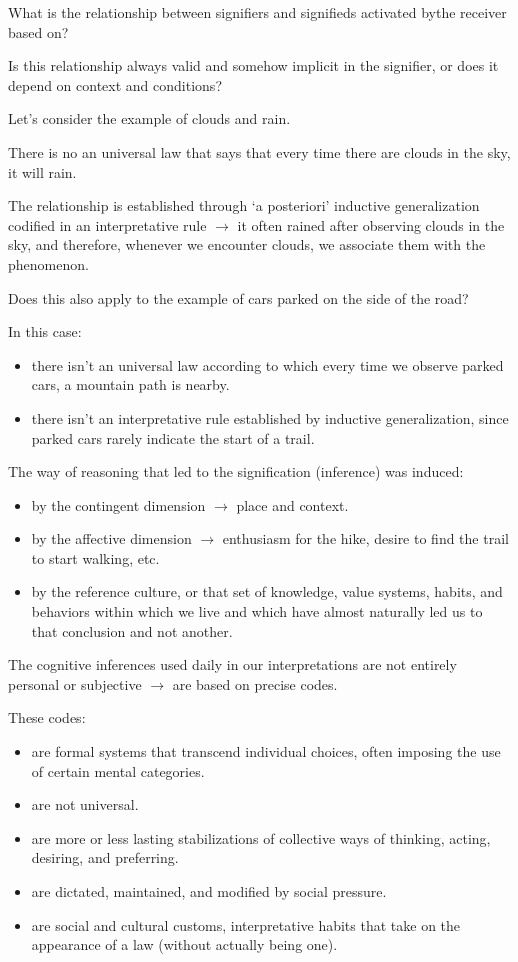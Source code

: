 What is the relationship between signifiers and signifieds activated bythe receiver based  on?

Is this relationship always valid and somehow implicit in the signifier, or does it depend on context and conditions?

Let's consider the example of clouds and rain.

There is no an universal law that says that every time there are clouds in the sky, it will rain.

The relationship is established through `a posteriori' inductive generalization codified in an interpretative rule \(\rightarrow\) it often rained after observing clouds in the sky, and therefore, whenever we encounter clouds, we associate them with the phenomenon.

Does this also apply to the example of cars parked on the side of the road?

In this case:

\begin{itemize}
\tightlist
\item there isn't an universal law according to which every time we observe parked cars, a mountain path is nearby.
\item there isn't an interpretative rule established by inductive generalization, since parked cars rarely indicate the start of a trail.
\end{itemize}

The way of reasoning that led to the signification (inference) was induced:

\begin{itemize}
\tightlist
\item by the contingent dimension \(\rightarrow\) place and context.
\item by the affective dimension \(\rightarrow\) enthusiasm for the hike, desire to find the trail to start walking, etc.
\item by the reference culture, or that set of knowledge, value systems, habits, and behaviors within which we live and which have almost naturally led us to that conclusion and not another.
\end{itemize}

The cognitive inferences used daily in our interpretations are not entirely personal or subjective \(\rightarrow\) are based on precise codes.

These codes:

\begin{itemize}
\tightlist
\item are formal systems that transcend individual choices, often imposing the use of certain mental categories.
\item are not universal.
\item are more or less lasting stabilizations of collective ways of thinking, acting, desiring, and preferring.
\item are dictated, maintained, and modified by social pressure.
\item are social and cultural customs, interpretative habits that take on the appearance of a law (without actually being one).
\end{itemize}

